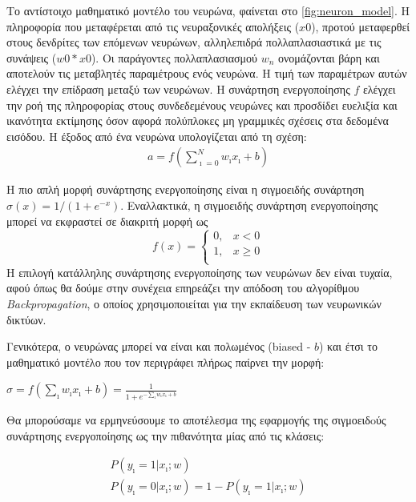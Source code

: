 Το αντίστοιχο μαθηματικό μοντέλο του νευρώνα, φαίνεται στο \autoref{fig:neuron_model}.
Η πληροφορία που μεταφέρεται από τις νευραξονικές απολήξεις ($x0$), προτού μεταφερθεί
στους δενδρίτες των επόμενων νευρώνων, αλληλεπιδρά πολλαπλασιαστικά με τις
συνάψεις ($w0*x0$). Οι παράγοντες πολλαπλασιασμού $w_n$ ονομάζονται βάρη
και αποτελούν τις μεταβλητές παραμέτρους ενός νευρώνα. Η τιμή των παραμέτρων
αυτών ελέγχει την επίδραση μεταξύ των νευρώνων. Η συνάρτηση ενεργοποίησης $f$
ελέγχει την ροή της πληροφορίας στους συνδεδεμένους νευρώνες
και προσδίδει ευελιξία και ικανότητα εκτίμησης όσον αφορά πολύπλοκες μη γραμμικές
σχέσεις στα δεδομένα εισόδου. Η έξοδος από ένα νευρώνα υπολογίζεται από τη σχέση:
\begin{gather*}
  a = f(\sum_{\imath=0}^{N}w_{\imath}x_{\imath} + b)
\end{gather*}

Η πιο απλή μορφή συνάρτησης ενεργοποίησης
είναι η σιγμοειδής συνάρτηση $\sigma(x) = 1 / (1 + e^{-x})$.
Εναλλακτικά, η σιγμοειδής συνάρτηση ενεργοποίησης μπορεί να εκφραστεί σε διακριτή μορφή ως
\[
f(x) =
  \begin{cases}
    0, & x < 0 \\
    1, & x \geq 0 \\
  \end{cases}
\]
Η επιλογή κατάλληλης συνάρτησης ενεργοποίησης των
νευρώνων δεν είναι τυχαία, αφού όπως θα δούμε στην
συνέχεια επηρεάζει την απόδοση του αλγορίθμου \emph{Backpropagation}, ο οποίος
χρησιμοποιείται για την εκπαίδευση των νευρωνικών δικτύων.

Γενικότερα, ο νευρώνας μπορεί να είναι και πολωμένος (biased - $b$) και έτσι το μαθηματικό
μοντέλο που τον περιγράφει πλήρως παίρνει την μορφή:
\begin{center}
\begin{large}
  $\sigma = f(\sum_{\imath}w_{\imath}x_{\imath} + b) = \frac{1}{1 + e^{-\sum_{\imath}w_{\imath}x_{\imath} + b}}$
\end{large}
\end{center}
Θα μπορούσαμε να ερμηνεύσουμε το αποτέλεσμα της εφαρμογής της
σιγμοειδoύς συνάρτησης ενεργοποίησης ως την πιθανότητα μίας από τις κλάσεις:
\begin{large}
\begin{gather*}
  P(y_{\imath} = 1 | x_{\imath};w) \\
  P(y_{\imath} = 0 | x_{\imath};w) = 1 - P(y_{\imath} = 1 | x_{\imath};w)
\end{gather*}
\end{large}

